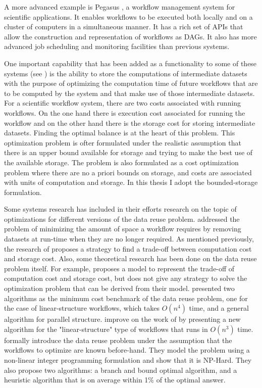 A more advanced example is Pegasus \citep{singh2008workflow}, a workflow management system for scientific applications.  It enables workflows to be executed both locally and on a cluster of computers in a simultaneous manner.  It has a rich set of APIs that allow the construction and representation of workflows as DAGs.  It also has more advanced job scheduling and monitoring facilities than previous systems.  

One important capability that has been added as a functionality to some of these systems (see \cite{yuan2012data}) is the ability to store the computations of intermediate datasets with the purpose of optimizing the computation time of future workflows that are to be computed by the system and that make use of those intermediate datasets. For a scientific workflow system, there are two costs associated with running workflows.  On the one hand there is execution cost associated for running the workflow and on the other hand there is the storage cost for storing intermediate datasets.  Finding the optimal balance is at the heart of this problem.  This optimization problem is ofter formulated under the realistic assumption that there is an upper bound available for storage and trying to make the best use of the available storage.  The problem is also formulated as a cost optimization problem where there are no a priori bounds on storage, and costs are associated with units of computation and storage.  In this thesis I adopt the bounded-storage formulation.

Some systems research has included in their efforts research on the topic of optimizations for different versions of the data reuse problem.  \cite{ramakrishnan2007scheduling} addressed the problem of minimizing the amount of space a workflow requires by removing datasets at run-time when they are no longer required.  As mentioned previously, the research of \cite{yuan2012data} proposes a strategy to find a trade-off between computation cost and storage cost. Also, some theoretical research has been done on the data reuse problem itself. For example, \cite{adams2009maximizing} proposes a model to represent the trade-off of computation cost and storage cost, but does not give any strategy to solve the optimization problem that can be derived from their model. \cite{yuan2011demand} presented two algorithms as the minimum cost benchmark of the data reuse problem, one for the case of linear-structure workflows, which takes $O(n^4)$ time, and a general algorithm for parallel structure. \cite{cheng2015new} improve on the work of \cite{yuan2011demand} by presenting a new algorithm for the "linear-structure" type of workflows that runs in $O(n^3)$ time. \cite{zohrevandi2013bounded} formally introduce the data reuse problem under the assumption that the workflows to optimize are known before-hand. They model the problem using a non-linear integer programming formulation and show that  it is NP-Hard.  They also propose two algorithms: a branch and bound optimal algorithm, and a heuristic algorithm that is on average within 1\% of the optimal answer.
